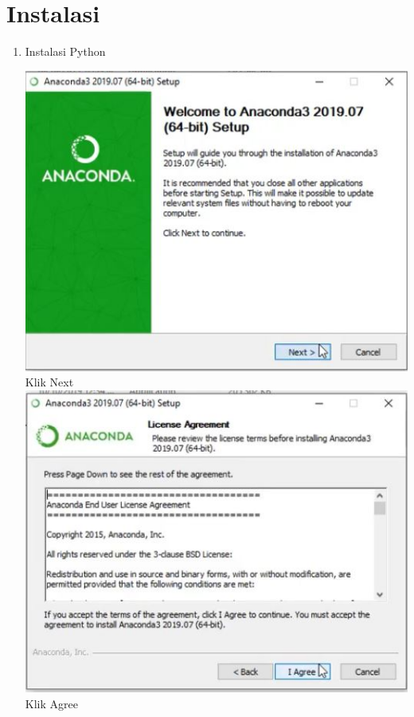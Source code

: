 
\section{Instalasi}
\begin{enumerate}

\item Instalasi Python

\includegraphics{gambar/1_1.jpg}
Klik Next\\

\includegraphics{gambar/1_2.jpg}
Klik Agree\\


\end{enumerate}
